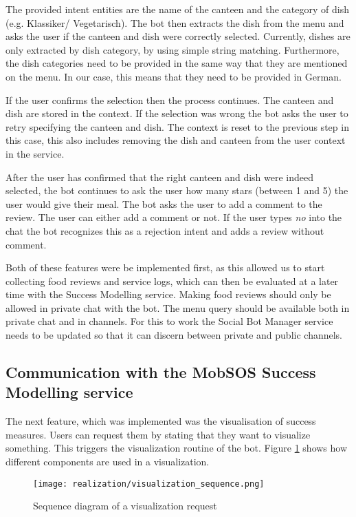 The provided intent entities are the name of the canteen and the category of dish (e.g. Klassiker/ Vegetarisch).
The bot then extracts the dish from the menu and asks the user if the canteen and dish were correctly selected. 
Currently, dishes are only extracted by dish category, by using simple string matching. Furthermore, the dish categories need to be provided in the same way that they are mentioned on the menu. In our case, this means that they need to be provided in German.

If the user confirms the selection then the process continues. 
The canteen and dish are stored in the context. 
If the selection was wrong the bot asks the user to retry specifying the canteen and dish. 
The context is reset to the previous step in this case, this also includes removing the dish and canteen from the user context in the service.

After the user has confirmed that the right canteen and dish were indeed selected, the bot continues to ask the user how many stars (between 1 and 5) the user would give their meal. 
The bot asks the user to add a comment to the review. The user can either add a comment or not. If the user types \emph{no} into the chat the bot recognizes this as a rejection intent and adds a review without comment.

Both of these features were be implemented first, as this allowed us to start collecting food reviews and service logs, which can then be evaluated at a later time with the Success Modelling service.
Making food reviews should only be allowed in private chat with the bot. 
The menu query should be available both in private chat and in channels.
For this to work the Social Bot Manager service needs to be updated so that it can discern between private and public channels.

\subsection{Communication with the MobSOS Success Modelling service}

The next feature, which was implemented was the visualisation of success measures. Users can request them by stating that they want to visualize something.
This triggers the visualization routine of the bot. Figure \ref{fig:visualReqSeq} shows how different components are used in a visualization.
\begin{figure}[h]
    \centering
    \texttt{[image: realization/visualization\_sequence.png]}
    \caption{Sequence diagram of a visualization request}
    \label{fig:visualReqSeq}
\end{figure}

